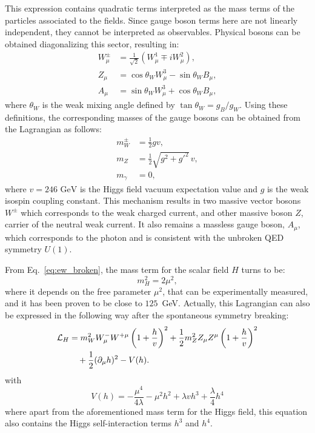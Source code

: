 This expression contains quadratic terms interpreted as the mass terms of the particles associated to the fields. Since gauge boson terms here are not linearly independent, they cannot be interpreted as observables. Physical bosons can be obtained diagonalizing this sector, resulting in:
\begin{align}
W^\pm_\mu &= \frac{1}{\sqrt{2}} \left( W^1_\mu \mp i W^2_\mu \right), \\
Z_\mu &= \cos\theta_W W^3_\mu - \sin\theta_W B_\mu, \\
A_\mu &= \sin\theta_W W^3_\mu + \cos\theta_W B_\mu,
\end{align}
where $\theta_W$ is the weak mixing angle defined by $\tan \theta_W = g_B /g_W$.
Using these definitions, the corresponding masses of the gauge bosons can be obtained from the Lagrangian as follows:
\begin{align}
m^{\pm}_W &= \frac{1}{2} g v, \\
m_Z &= \frac{1}{2} \sqrt{g^2 + g'^2} \, v, \\
m_\gamma &= 0,
\end{align}
where $v = 246 \text{  GeV}$ is the Higgs field vacuum expectation value and $g$ is the weak isospin coupling constant. 
This mechanism results in two massive vector bosons $W^{\pm}$ which corresponds to the weak charged current, and other massive boson $Z$, carrier of the neutral weak current. It also remains a massless gauge boson, $A_{\mu}$, which corresponds to the photon and is consistent with the unbroken QED symmetry $U(1)$.

From Eq.~\ref{eq:ew_broken}, the mass term for the scalar field $H$ turns to be:
\begin{equation}
m_H^2 = 2 \mu^2,
\end{equation}
where it depends on the free parameter $\mu^2$, that can be experimentally measured, and it has been proven to be close to $125$~GeV.
Actually, this Lagrangian can also be expressed in the following way after the spontaneous symmetry breaking: 
\begin{align}
\mathcal{L}_{H} &= m_W^2 W^-_{\mu} W^{+\mu} \left( 1 + \frac{h}{v} \right)^2
+ \frac{1}{2} m_Z^2 Z_{\mu} Z^{\mu} \left( 1 + \frac{h}{v} \right)^2 \notag \\
&\quad + \frac{1}{2} (\partial_{\mu} h)^2 - V(h).
\label{allterms}
\end{align}
with
\begin{equation}
    V(h) = -\frac{\mu^{4}}{4\lambda} - \mu^2h^2 + \lambda v h^3 + \frac{\lambda}{4}h^4
\label{hcoupl}
\end{equation}
where apart from the aforementioned mass term for the Higgs field, this equation also contains the Higgs self-interaction terms $h^3$ and $h^4$. 

